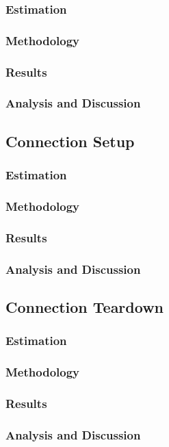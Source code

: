 \subsubsection{Estimation}
\subsubsection{Methodology}
\subsubsection{Results}
\subsubsection{Analysis and Discussion}
\subsection{Connection Setup}
\subsubsection{Estimation}
\subsubsection{Methodology}
\subsubsection{Results}
\subsubsection{Analysis and Discussion}
\subsection{Connection Teardown}
\subsubsection{Estimation}
\subsubsection{Methodology}
\subsubsection{Results}
\subsubsection{Analysis and Discussion}


